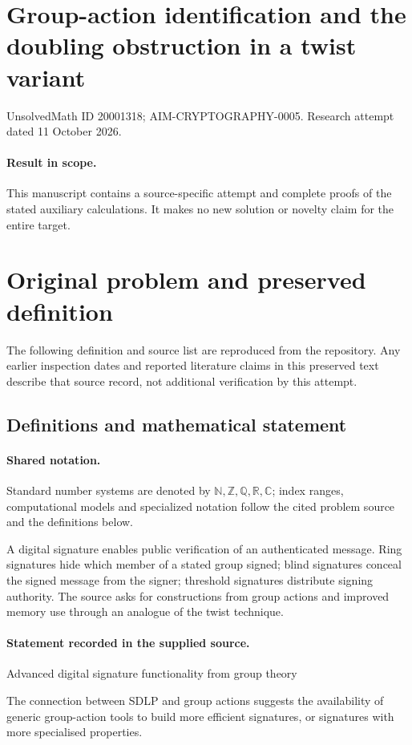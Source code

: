 \documentclass[11pt]{article}
\begin{document}
\section*{Group-action identification and the doubling obstruction in a twist variant}
\noindent UnsolvedMath ID 20001318; AIM-CRYPTOGRAPHY-0005. Research attempt dated 11 October 2026.
\paragraph{Result in scope.}This manuscript contains a source-specific attempt and complete proofs of the stated auxiliary calculations. It makes no new solution or novelty claim for the entire target.
\section{Original problem and preserved definition}
The following definition and source list are reproduced from the repository. Any earlier inspection dates and reported literature claims in this preserved text describe that source record, not additional verification by this attempt.
\subsection{Definitions and mathematical statement}

\paragraph{Shared notation.}Standard number systems are denoted by $\mathbb N,\mathbb Z,\mathbb Q,\mathbb R,\mathbb C$; index ranges, computational models and specialized notation follow the cited problem source and the definitions below.


A digital signature enables public verification of an authenticated message. Ring signatures hide which member of a stated group signed; blind signatures conceal the signed message from the signer; threshold signatures distribute signing authority. The source asks for constructions from group actions and improved memory use through an analogue of the twist technique.
\paragraph{Statement recorded in the supplied source.}
Advanced digital signature functionality from group theory

The connection between SDLP and group actions suggests the availability of generic group-action tools to build more efficient signatures, or signatures with more specialised properties.
\end{document}
